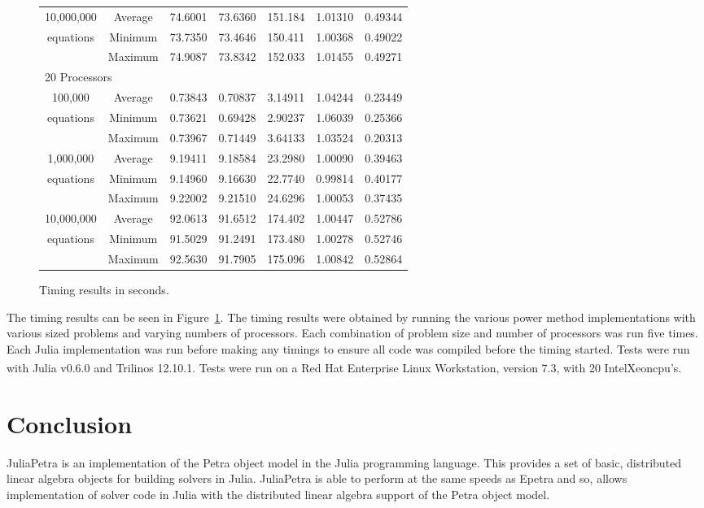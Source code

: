 \documentclass[acmsmall]{acmart}
\let\oldtextregister\textregistered
\renewcommand{\textregistered}{\textsuperscript{\tiny\oldtextregister}}
\begin{document}
\begin{figure}[h]
\begin{tabular}{|c c|r|r|r||r|r|}
	\hline
		10,000,000		&Average & 74.6001 & 73.6360 & 151.184 & 1.01310 & 0.49344 \\
		equations		&Minimum & 73.7350 & 73.4646 & 150.411 & 1.00368 & 0.49022 \\
						&Maximum & 74.9087 & 73.8342 & 152.033 & 1.01455 & 0.49271 \\
	\hline
			\multicolumn{7}{|l|}{20 Processors}\\
	\hline
		100,000			&Average & 0.73843 & 0.70837 & 3.14911 & 1.04244 & 0.23449 \\
		equations		&Minimum & 0.73621 & 0.69428 & 2.90237 & 1.06039 & 0.25366 \\
						&Maximum & 0.73967 & 0.71449 & 3.64133 & 1.03524 & 0.20313 \\
	\hline
		1,000,000		&Average & 9.19411 & 9.18584 & 23.2980 & 1.00090 & 0.39463 \\
		equations		&Minimum & 9.14960 & 9.16630 & 22.7740 & 0.99814 & 0.40177 \\
						&Maximum & 9.22002 & 9.21510 & 24.6296 & 1.00053 & 0.37435 \\
	\hline
		10,000,000		&Average & 92.0613 & 91.6512 & 174.402 & 1.00447 & 0.52786 \\
		equations		&Minimum & 91.5029 & 91.2491 & 173.480 & 1.00278 & 0.52746 \\
						&Maximum & 92.5630 & 91.7905 & 175.096 & 1.00842 & 0.52864 \\
	\hline
\end{tabular}

\caption{Timing results in seconds.}
\label{fig:timing-results}
\end{figure}

The timing results can be seen in Figure~\ref{fig:timing-results}.
The timing results were obtained by running the various power method implementations
with various sized problems and varying numbers of processors.
Each combination of problem size and number of processors was run five times.
Each Julia implementation was run before making any timings to ensure all code was
compiled before the timing started.
Tests were run with Julia v0.6.0 and Trilinos 12.10.1.
Tests were run on a Red Hat Enterprise Linux Workstation, version 7.3,
with 20 Intel\textregistered Xeon\textregistered cpu's.


\section{Conclusion}

JuliaPetra is an implementation of the Petra object model in the Julia programming language.
This provides a set of basic, distributed linear algebra objects for building solvers in Julia.
JuliaPetra is able to perform at the same speeds as Epetra and so, allows implementation of
solver code in Julia with the distributed linear algebra support of the Petra object model.



\end{document}
